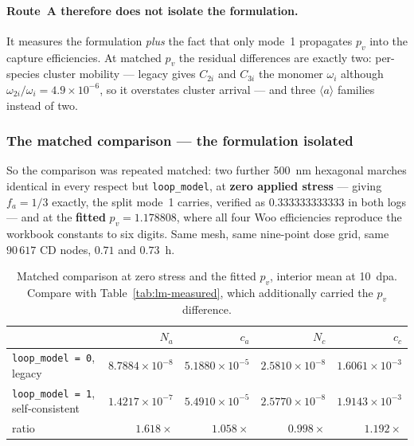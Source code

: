 \documentclass[11pt]{article}
\newcommand{\aloop}{\ensuremath{\langle a\rangle}}
\newcommand{\code}[1]{\texttt{\small #1}}
\begin{document}
\paragraph{Route~A therefore does not isolate the formulation.} It measures the
formulation \emph{plus} the fact that only mode~1 propagates $p_v$ into the
capture efficiencies. At matched $p_v$ the residual differences are exactly two:
per-species cluster mobility --- legacy gives $C_{2i}$ and $C_{3i}$ the monomer
$\omega_i$ although $\omega_{2i}/\omega_i = 4.9\times10^{-6}$, so it overstates
cluster arrival --- and three \aloop{} families instead of two.

\subsubsection{The matched comparison --- the formulation isolated}
\label{sec:lm-matched}

So the comparison was repeated matched: two further 500~nm hexagonal marches
identical in every respect but \code{loop\_model}, at \textbf{zero applied
stress} --- giving $f_a = 1/3$ exactly, the split mode~1 carries, verified as
$0.333333333333$ in both logs --- and at the \textbf{fitted} $p_v = 1.178808$,
where all four Woo efficiencies reproduce the workbook constants to six digits.
Same mesh, same nine-point dose grid, same $90\,617$ CD nodes, $0.71$ and
$0.73$~h.

\begin{table}[htbp]
\centering
\caption{Matched comparison at zero stress and the fitted $p_v$, interior mean
         at 10~\textrm{dpa}. Compare with Table~\ref{tab:lm-measured}, which
         additionally carried the $p_v$ difference.}
\label{tab:lm-matched}
\begin{tabular}{@{}lrrrr@{}}
\toprule
 & $N_a$ & $c_a$ & $N_c$ & $c_c$ \\
\midrule
\code{loop\_model = 0}, legacy          & $8.7884\times10^{-8}$ & $5.1880\times10^{-5}$ & $2.5810\times10^{-8}$ & $1.6061\times10^{-3}$ \\
\code{loop\_model = 1}, self-consistent & $1.4217\times10^{-7}$ & $5.4910\times10^{-5}$ & $2.5770\times10^{-8}$ & $1.9143\times10^{-3}$ \\
\quad ratio                             & $\mathbf{1.618\times}$ & $1.058\times$ & $0.998\times$ & $\mathbf{1.192\times}$ \\
\bottomrule
\end{tabular}
\end{table}
\end{document}
